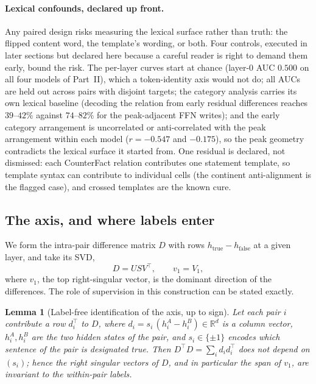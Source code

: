 \documentclass[11pt]{article}
\newtheorem{lemma}{Lemma}
\begin{document}
\paragraph{Lexical confounds, declared up front.} Any paired design
risks measuring the lexical surface rather than truth: the flipped content
word, the template's wording, or both. Four controls, executed in later
sections but declared here because a careful reader is right to demand them
early, bound the risk. The per-layer curves start at chance (layer-$0$ AUC
$0.500$ on all four models of Part~II), which a token-identity axis would
not do; all AUCs are held out across pairs with disjoint targets; the
category analysis carries its own lexical baseline (decoding the relation
from early residual differences reaches $39$--$42\%$ against $74$--$82\%$
for the peak-adjacent FFN writes); and the early category arrangement is
uncorrelated or anti-correlated with the peak arrangement within each model
($r = -0.547$ and $-0.175$), so the peak geometry contradicts the lexical
surface it started from. One residual is declared, not dismissed: each
CounterFact relation contributes one statement template, so template syntax
can contribute to individual cells (the continent anti-alignment is the
flagged case), and crossed templates are the known cure.

\subsection{The axis, and where labels enter}
\label{sec:axis}

We form the intra-pair difference matrix $D$ with rows
$h_{\text{true}} - h_{\text{false}}$ at a given layer, and take its SVD,
\begin{equation}
D = U S V^{\top}, \qquad v_{1} = V_{1},
\end{equation}
where $v_1$, the top right-singular vector, is the dominant direction of the
differences. The role of supervision in this construction can be stated
exactly.

\begin{lemma}[Label-free identification of the axis, up to sign]
\label{lem:labels}
Let each pair $i$ contribute a row $d_i^{\top}$ to $D$, where
$d_i = s_i\,(h_i^{A} - h_i^{B}) \in \mathbb{R}^{d}$ is a column vector,
$h_i^{A}, h_i^{B}$ are the two hidden states of the pair, and
$s_i \in \{\pm 1\}$ encodes which sentence of the pair is designated true.
Then $D^{\top} D = \sum_i d_i d_i^{\top}$ does not depend on $(s_i)$; hence
the right singular vectors of $D$, and in particular the span of $v_1$, are
invariant to the within-pair labels.
\end{lemma}
\end{document}
